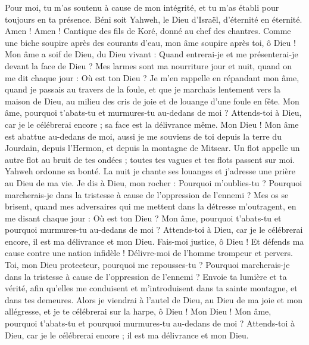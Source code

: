 \begin{multicols}{2}
Pour moi, tu m'as soutenu à cause de mon intégrité, et tu m'as établi pour toujours en ta présence.
Béni soit Yahweh, le Dieu d'Israël, d’éternité en éternité. Amen ! Amen !
\VerseOne{}Cantique des fils de Koré, donné au chef des chantres.
Comme une biche soupire après des courants d’eau, mon âme soupire après toi, ô Dieu !
Mon âme a soif de Dieu, du Dieu vivant : Quand entrerai-je et me présenterai-je devant la face de Dieu ?
Mes larmes sont ma nourriture jour et nuit, quand on me dit chaque jour : Où est ton Dieu ?
Je m’en rappelle en répandant mon âme, quand je passais au travers de la foule, et que je marchais lentement vers la maison de Dieu, au milieu des cris de joie et de louange d’une foule en fête.
Mon âme, pourquoi t'abats-tu et murmures-tu au-dedans de moi ? Attends-toi à Dieu, car je le célébrerai encore ; sa face est la délivrance même.
Mon Dieu ! Mon âme est abattue au-dedans de moi, aussi je me souviens de toi depuis la terre du Jourdain, depuis l’Hermon, et depuis la montagne de Mitsear.
Un flot appelle un autre flot au bruit de tes ondées ; toutes tes vagues et tes flots passent sur moi.
Yahweh ordonne sa bonté. La nuit je chante ses louanges et j’adresse une prière au Dieu de ma vie.
Je dis à Dieu, mon rocher : Pourquoi m'oublies-tu ? Pourquoi marcherais-je dans la tristesse à cause de l'oppression de l'ennemi ?
Mes os se brisent, quand mes adversaires qui me mettent dans la détresse m’outragent, en me disant chaque jour : Où est ton Dieu ?
Mon âme, pourquoi t'abats-tu et pourquoi murmures-tu au-dedans de moi ? Attends-toi à Dieu, car je le célébrerai encore, il est ma délivrance et mon Dieu.
\VerseOne{}Fais-moi justice, ô Dieu ! Et défends ma cause contre une nation infidèle ! Délivre-moi de l'homme trompeur et pervers.
Toi, mon Dieu protecteur, pourquoi me repousses-tu ? Pourquoi marcherais-je dans la tristesse à cause de l'oppression de l'ennemi ?
Envoie ta lumière et ta vérité, afin qu'elles me conduisent et m'introduisent dans ta sainte montagne, et dans tes demeures.
Alors je viendrai à l'autel de Dieu, au Dieu de ma joie et mon allégresse, et je te célébrerai sur la harpe, ô Dieu ! Mon Dieu !
Mon âme, pourquoi t'abats-tu et pourquoi murmures-tu au-dedans de moi ? Attends-toi à Dieu, car je le célébrerai encore ; il est ma délivrance et mon Dieu.

\end{multicols}
